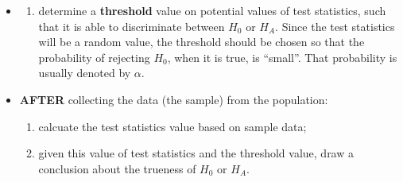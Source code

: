 \begin{frame}
  \vspace*{.25cm}
  \begin{itemize}
    \item[] 
    \begin{enumerate}
      \setcounter{enumi}{+2}
      \item determine a \textbf{threshold} value on potential values of test statistics, such that it is able to discriminate between $H_0$ or $ H_A $. Since the test statistics will be a random value, the threshold should be chosen so that the probability of rejecting $H_0$, when it is true, is ``small''. That probability is usually denoted by {\boldmath$\alpha$}.
    \end{enumerate}
  \end{itemize}
  \vspace{1cm}
  \begin{itemize}
    \item[\checkmark] \textbf{AFTER} collecting the data (the sample) from the population:
    \vspace*{.25cm}
    \begin{enumerate}
      \item calcuate the test statistics value based on sample data;
      \vspace*{.25cm}
      \item given this value of test statistics and the threshold value, draw a conclusion about the trueness of $H_0$ or $ H_A $.
    \end{enumerate}
  \end{itemize}
\end{frame}


